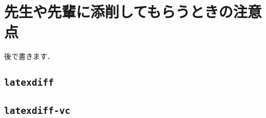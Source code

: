 \chapter{先生や先輩に添削してもらうときの注意点}
\label{ch:check}

\begin{tcolorbox}
    後で書きます．
\end{tcolorbox}

\section{\texttt{latexdiff}}
\label{sec:latexdiff}



\section{\texttt{latexdiff-vc}}
\label{sec:latexdiff-vc}

